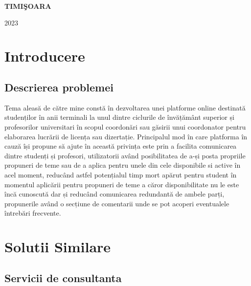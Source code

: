 \documentclass[12pt,a4paper,hidelinks]{report}
\theoremstyle{definition}
\theoremstyle{remark}
\begin{document}
\vfill
\begin{center}
{\bf TIMI\c SOARA

2023}
\end{center}
\newpage
\normalsize{}
\tableofcontents
\newpage
\chapter{Introducere}

\section{Descrierea problemei}
Tema aleasă de către mine constă în dezvoltarea unei platforme online destinată studenților în anii terminali la unul dintre ciclurile de învățământ superior și profesorilor universitari în scopul coordonări sau găsirii unui coordonator pentru elaborarea lucrării de licența sau dizertație. Principalul mod în care platforma în cauză își propune să ajute în această privința este prin a facilita comunicarea dintre studenți și profesori, utilizatorii având posibilitatea de a-și posta propriile propuneri de teme sau de a aplica pentru unele din cele disponibile si active în acel moment, reducând astfel potențialul timp mort apărut pentru student în momentul aplicării pentru propuneri de teme a căror disponibilitate nu le este încă cunoscută dar și reducând comunicarea redundantă de ambele parți, propunerile având o secțiune de comentarii unde se pot acoperi eventualele întrebări frecvente.
\chapter{Solutii Similare}
\section{Servicii de consultanta}
\end{document}
